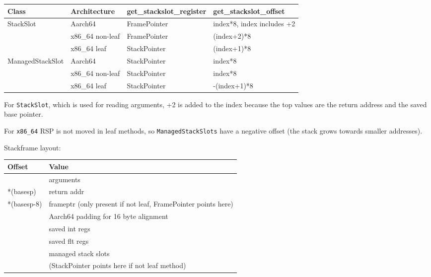 \documentclass[draft,final]{vutinfth} %
\begin{document}
    \begin{tabular}{llll}
        \toprule
        Class            & Architecture     & get\_stackslot\_register & get\_stackslot\_offset     \\
        \midrule
        StackSlot        & Aarch64          & FramePointer             & index*8, index includes +2 \\
        & x86\_64 non-leaf & FramePointer             & (index+2)*8                \\
        & x86\_64 leaf     & StackPointer             & (index+1)*8                \\
        \midrule
        ManagedStackSlot & Aarch64          & StackPointer             & index*8                    \\
        & x86\_64 non-leaf & StackPointer             & index*8                    \\
        & x86\_64 leaf     & StackPointer             & -(index+1)*8               \\
        \bottomrule
    \end{tabular}

    For \lstinline{StackSlot}, which is used for reading arguments, +2 is added to the index because the top values are the return address and the saved base pointer.

    For \texttt{x86\_64} RSP is not moved in leaf methods, so \lstinline{ManagedStackSlots} have a negative offset (the stack grows towards smaller addresses).

    Stackframe layout:

    \begin{tabular}{ll}
        \toprule
        \textbf{Offset} & \textbf{Value}                                                \\
        \midrule
        & arguments \\
        *(basesp)       & return addr                                                   \\
        *(basesp-8)     & frameptr (only present if not leaf, FramePointer points here) \\
        & Aarch64 padding for 16 byte alignment                         \\
        & saved int regs                                                \\
        & saved flt regs                                                \\
        & managed stack slots                                           \\
        & (StackPointer points here if not leaf method)                 \\
        \bottomrule
    \end{tabular}
\end{document}

